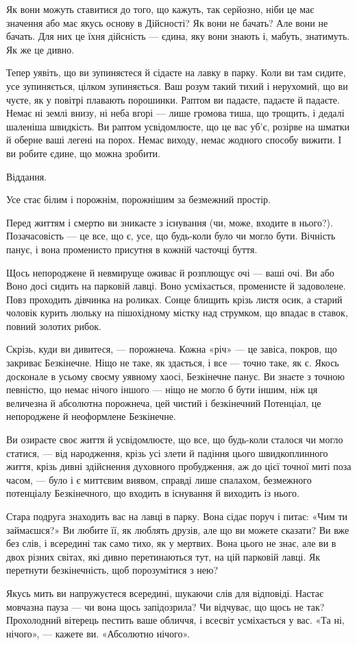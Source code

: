 Як вони можуть ставитися до того, що кажуть, так серйозно, ніби це має значення або має якусь основу в Дійсності? Як вони не бачать? Але вони не бачать. Для них це їхня дійсність — єдина, яку вони знають і, мабуть, знатимуть. Як же це дивно.

Тепер уявіть, що ви зупиняєтеся й сідаєте на лавку в парку. Коли ви там сидите, усе зупиняється, цілком зупиняється. Ваш розум такий тихий і нерухомий, що ви чуєте, як у повітрі плавають порошинки. Раптом ви падаєте, падаєте й падаєте. Немає ні землі внизу, ні неба вгорі — лише громова тиша, що трощить, і дедалі шаленіша швидкість. Ви раптом усвідомлюєте, що це вас уб'є, розірве на шматки й оберне ваші легені на порох. Немає виходу, немає жодного способу вижити. І ви робите єдине, що можна зробити.

Віддання.

Усе стає білим і порожнім, порожнішим за безмежний простір.

Перед життям і смертю ви зникаєте з існування (чи, може, входите в нього?). Позачасовість — це все, що є, усе, що будь-коли було чи могло бути. Вічність панує, і вона променисто присутня в кожній часточці буття.

Щось непороджене й невмируще оживає й розплющує очі — ваші очі. Ви або Воно досі сидить на парковій лавці. Воно усміхається, променисте й задоволене. Повз проходить дівчинка на роликах. Сонце блищить крізь листя осик, а старий чоловік курить люльку на пішохідному містку над струмком, що впадає в ставок, повний золотих рибок.

Скрізь, куди ви дивитеся, — порожнеча. Кожна «річ» — це завіса, покров, що закриває Безкінечне. Ніщо не таке, як здається, і все — точно таке, як є. Якось досконале в усьому своєму уявному хаосі, Безкінечне панує. Ви знаєте з точною певністю, що немає нічого іншого — ніщо не могло б бути іншим, ніж ця величезна й абсолютна порожнеча, цей чистий і безкінечний Потенціал, це непороджене й неоформлене Безкінечне.

Ви озираєте своє життя й усвідомлюєте, що все, що будь-коли сталося чи могло статися, — від народження, крізь усі злети й падіння цього швидкоплинного життя, крізь дивні здійснення духовного пробудження, аж до цієї точної миті поза часом, — було і є миттєвим виявом, справді лише спалахом, безмежного потенціалу Безкінечного, що входить в існування й виходить із нього.

Стара подруга знаходить вас на лавці в парку. Вона сідає поруч і питає: «Чим ти займаєшся?» Ви любите її, як люблять друзів, але що ви можете сказати? Ви вже без слів, і всередині так само тихо, як у мертвих. Вона цього не знає, але ви в двох різних світах, які дивно перетинаються тут, на цій парковій лавці. Як перетнути безкінечність, щоб порозумітися з нею?

Якусь мить ви напружуєтеся всередині, шукаючи слів для відповіді. Настає мовчазна пауза — чи вона щось запідозрила? Чи відчуває, що щось не так? Прохолодний вітерець пестить ваше обличчя, і всесвіт усміхається у вас. «Та ні, нічого», — кажете ви. «Абсолютно нічого».
